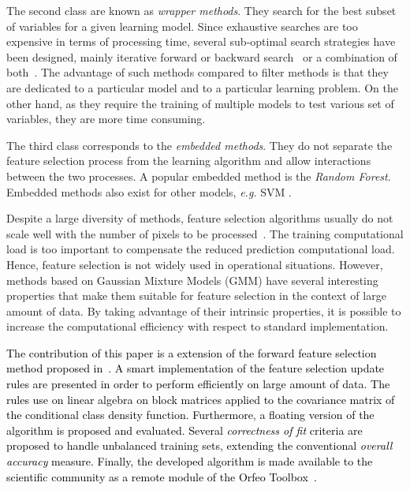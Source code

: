 \documentclass[journal,10pt]{IEEEtran}
\newcommand{\rev}[1]{\textcolor{black}{#1}}
\begin{document}
The second class are known as \emph{wrapper methods}. They search for the best subset of variables for a given learning model. Since exhaustive searches are too expensive in terms of processing time, several sub-optimal search strategies have been designed, mainly iterative forward or backward search~\cite{whitney1971direct,marill1963effectiveness} or a combination of both~\cite{somol1999adaptive}. The advantage of such methods compared to filter methods is that they are dedicated to a particular model and to a particular learning problem. On the other hand, as they require the training of multiple models to test various set of variables, they are more time consuming.


The third class corresponds to the \emph{embedded methods}. They do not separate the feature selection process from the learning algorithm and allow interactions between the two processes. A popular embedded method is the \emph{Random Forest}. Embedded methods also exist for other models, \emph{e.g.} SVM \cite{guyon2002gene,weston2003use,tuia2015multiclass}.

Despite a large diversity of methods, feature selection algorithms usually do not scale well with the number of pixels to be processed~\cite{fauvel2015fast}. The training computational load is too important to compensate the reduced prediction computational load. Hence, feature selection is not widely used in operational situations. However, methods based on Gaussian Mixture Models (GMM) have several interesting properties that make them suitable for feature selection in the context of large amount of data. By taking advantage of their intrinsic properties, it is possible to increase the computational efficiency with respect to standard implementation.

\rev{The contribution of this paper is a extension of the forward feature selection method proposed in~\cite{fauvel2015fast}. A smart implementation of the feature selection update rules are presented in order to perform efficiently on large amount of data. The rules use on linear algebra on block matrices applied to the covariance matrix of the conditional class density function.  Furthermore, a floating version of the algorithm is proposed and evaluated. Several \emph{correctness of fit} criteria are proposed to handle unbalanced training sets, extending the conventional \emph{overall accuracy} measure.  Finally, the developed algorithm is made available to the scientific community as a remote module of the Orfeo Toolbox~\cite{christophe2008orfeo}.}
\end{document}
